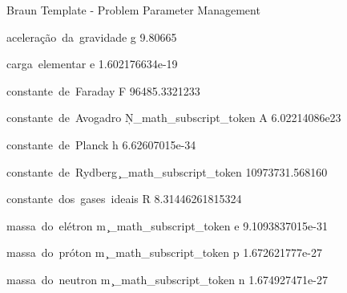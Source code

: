 %                                              
%                                              

%
{ Braun Template - Problem Parameter Management }



\ExplSyntaxOff



\ExplSyntaxOn

%                                              
%                                              

{ aceleração~da~gravidade }{ g }
{9.80665}{\meter\per\square\second}

{ carga~elementar }{ e }
{1.602176634e-19}{\coulomb}

{ constante~de~Faraday }{ F }
{96485.3321233}{\coulomb\per\mol}

{ constante~de~Avogadro }{ N\c_math_subscript_token A }
{6.02214086e23}{\per\mol}

{ constante~de~Planck }{ h }
{6.62607015e-34}{\joule\second}

{ constante~de~Rydberg }{ \c_math_subscript_token \infty }
{10973731.568160}{\per\meter}

{ constante~dos~gases~ideais }{ R }
{8.31446261815324}{\joule\per\kelvin\per\mol}
     
{ massa~do~elétron }{ m \c_math_subscript_token e }
{9.1093837015e-31}{\kilo\gram}

{ massa~do~próton }{ m \c_math_subscript_token p }
{1.672621777e-27}{\kilo\gram}

{ massa~do~neutron }{ m \c_math_subscript_token n }
{1.674927471e-27}{\kilo\gram}


